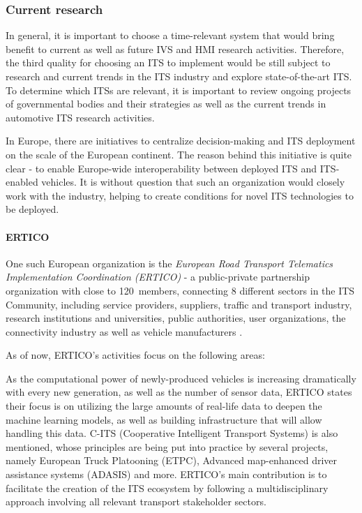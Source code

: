 \documentclass[main.tex]{subfiles}
\begin{document}
\subsubsection{Current research}\label{sec-research}

In general, it is important to choose a time-relevant system that would bring benefit to
current as well as future IVS and HMI research activities. Therefore, the third quality for choosing 
an ITS to implement would be still subject to research and current trends in 
the ITS industry and explore state-of-the-art ITS. To determine which ITSs are relevant, 
it is important to review ongoing projects of governmental bodies and their strategies as well as the
current trends in automotive ITS research activities.

In Europe, there are initiatives to centralize decision-making and ITS deployment on the scale of 
the European continent. The reason behind this initiative is quite clear - to enable Europe-wide 
interoperability between deployed ITS and ITS-enabled vehicles. It is without question that 
such an organization would closely work with the industry, helping to create conditions for novel 
ITS technologies to be deployed.

\paragraph{ERTICO}

One such European organization is the \emph{European Road Transport Telematics
Implementation Coordination (ERTICO)} - a public-private partnership organization
with close to 120~members, connecting 8 different sectors in the ITS Community, including
service providers, suppliers, traffic and transport industry, research institutions and
universities, public authorities, user organizations, the connectivity industry as well as
vehicle manufacturers \cite{ertico}.

As of now, ERTICO's activities focus on the following areas:

As the computational power of newly-produced vehicles is increasing dramatically with every 
new generation, as well as the number of sensor data, ERTICO states their focus is on utilizing 
the large amounts of real-life data to deepen the machine learning models, as well as building 
infrastructure that will allow handling this data. C-ITS (Cooperative Intelligent Transport
Systems) is also mentioned, whose principles are being put into practice by several projects, 
namely European Truck Platooning (ETPC), Advanced map-enhanced driver assistance systems (ADASIS) and 
more. ERTICO's main contribution is to facilitate the creation of the ITS ecosystem by following a
multidisciplinary approach involving all relevant transport stakeholder sectors.
\end{document}
